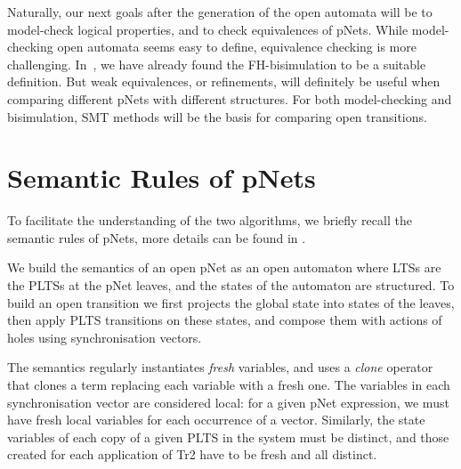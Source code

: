 \documentclass[smallcondensed]{svjour3}
\begin{document}
Naturally, our next goals after the generation of the open automata
will be to model-check logical properties, and to check equivalences
of pNets. While model-checking open automata seems easy to define,
equivalence checking is more challenging. 
In~\cite{henrio:Forte2016}, we
have already found the FH-bisimulation 
to be a suitable definition. But weak equivalences, or refinements, will
definitely be useful when comparing different pNets with
different structures. For both model-checking and bisimulation, SMT methods
will be the basis for comparing open transitions. 








\appendix

\section{Semantic Rules of pNets }
\label{appendix:semRules}

To facilitate the understanding of the two algorithms, we briefly recall the semantic rules of pNets, more details can be found in \cite{henrio:Forte2016}.

We build the semantics of an open pNet as an open automaton where
LTSs are the PLTSs at 
the pNet leaves, and the states of the automaton are structured. 
To build an open transition we first
 projects the global state into states of the leaves, then apply
PLTS transitions on these states, and compose them with actions of
holes using synchronisation vectors. 

The semantics   regularly instantiates \emph{fresh} variables, and uses a
\emph{clone} operator that clones a term replacing each variable with a
fresh one.
The variables in each synchronisation vector are considered local:
for a given pNet expression, we must have fresh local variables for
each occurrence of a vector. %
Similarly, the state variables of each copy of a
given PLTS in the system must be distinct, and those created for each
application of Tr2 have to be fresh and all distinct. 
\end{document}
